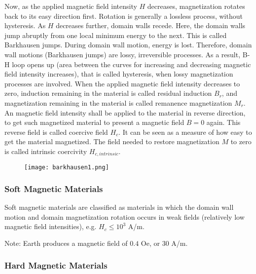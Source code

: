 Now, as the applied magnetic field intensity $H$ decreases, magnetization rotates back to its easy direction first. Rotation is generally a lossless process, without hysteresis. As $H$ decreases further, domain walls recede. Here, the domain walls jump abruptly from one local minimum energy to the next. This is called Barkhausen jumps. During domain wall motion, energy is lost. Therefore, domain wall motions (Barkhausen jumps) are lossy, irreversible processes. As a result, B-H loop opens up (area between the curves for increasing and decreasing magnetic field intensity increases), that is called hysteresis, when lossy magnetization processes are involved. When the applied magnetic field intensity decreases to zero, induction remaining in the material is called residual induction $B_{r}$, and magnetization remaining in the material is called remanence magnetization $M_{r}$. An magnetic field intensity shall be applied to the material in reverse direction, to get such magnetized material to present a magnetic field $B=0$ again. This reverse field is called coercive field $H_c$. It can be seen as a measure of how easy to get the material magnetized. The field needed to restore magnetization $M$ to zero is called intrinsic coercivity $H_{c,intrinsic}$.


\begin{figure}[h]
    \centering
    \texttt{[image: barkhausen1.png]}
\end{figure}


\subsubsection{Soft Magnetic Materials}

Soft magnetic materials are classified as materials in which the domain wall motion and domain magnetization rotation occurs in weak fields (relatively low magnetic field intensities), e.g. $H_{c} \leq 10^{3}$ A/m.

Note: Earth produces a magnetic field of $0.4$ Oe, or $30$ A/m.


\subsubsection{Hard Magnetic Materials}


